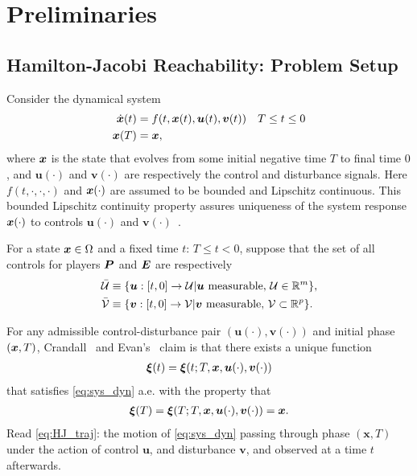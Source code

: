 
\section{Preliminaries} 
\label{sec:prelim} 
% 

\subsection{Hamilton-Jacobi Reachability: Problem Setup}
\noindent Consider the dynamical system
\begin{subequations}
	\begin{align}
		\dot{\bm{x}}(t) &= f(t, \bm{x}(t), \bm{u}(t), \bm{v}(t)) \quad T \le t \le 0 \\
		\bm{x}(T) &= \bm{x},
	\end{align}
	\label{eq:sys_dyn}
\end{subequations}
%
\noindent where $\bm{x}$ is the state that evolves from some initial negative time $T$ to final time $0$, and $\bm{u}(\cdot)$ and $\bm{v}(\cdot)$ are respectively the control and disturbance signals. Here $f(t, \cdot, \cdot, \cdot)$ and $\bm{x}(\cdot)$ are assumed to be bounded and Lipschitz continuous. This bounded Lipschitz continuity property assures uniqueness of the system response $\bm{x}(\cdot)$ to controls $\bm{u}(\cdot)$ and $\bm{v}(\cdot)$~\cite{Souganidis}. %

For a state $\bm{x} \in \Omega$ and a fixed time $t$: $T \le t < 0$, suppose that the set of all controls for players $\bm{P}$ and $\bm{E}$ are respectively
%
\begin{align}
	\mathcal{\bar{U}} &\equiv \{\bm{u}: [t, 0] \rightarrow \mathcal{U} | \bm{u} \text{ measurable}, \, \mathcal{U} \in \mathbb{R}^m \}, \\
	\mathcal{\bar{V}} &\equiv \{\bm{v}: [t, 0] \rightarrow \mathcal{V} | \bm{v} \text{ measurable},  \,\mathcal{V} \subset \mathbb{R}^p\}.
\end{align}

For any admissible control-disturbance pair $(\bm{u}(\cdot), \bm{v}(\cdot))$ and initial phase $(\bm{x}, T)$, Crandall~\cite{Crandall1983viscosity} and Evan's~\cite{Evans1984} claim is that there exists a unique function %
%
\begin{align}
	\bm{\xi}(t) = \bm{\xi}(t; T, \state, \bm{u}(\cdot), \bm{v}(\cdot))
	\label{eq:HJ_traj}
\end{align}
%
that satisfies \eqref{eq:sys_dyn} a.e. with the property that
\begin{align}
	\bm{\xi}(T) = \bm{\xi}(T; T, \bm{x}, \bm{u}(\cdot), \bm{v}(\cdot)) = \bm{x}.
\end{align}
%
Read \eqref{eq:HJ_traj}: the motion of \eqref{eq:sys_dyn} passing through phase $(\bm{x}, T)$ under the action of control $\bm{u}$, and disturbance $\bm{v}$, and observed at a time $t$ afterwards. 


